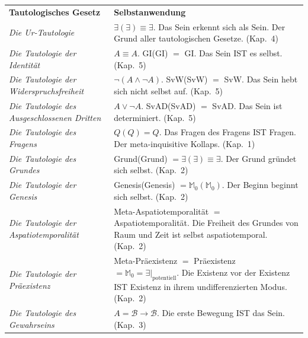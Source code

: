 \documentclass[10pt, openany, oneside]{book}
\renewcommand{\footnotesize}{\fontsize{8.5}{11}\selectfont}
\begin{document}
\vspace{0.5em}

{\footnotesize
\noindent\begin{tabular}{@{} p{} @{\hspace{0.5em}} p{} @{}}
\textbf{Tautologisches Gesetz} & \textbf{Selbstanwendung} \\[0.5em]

\textit{Die Ur-Tautologie} & $\exists(\exists) \equiv \exists$. Das Sein erkennt sich als Sein. Der Grund aller tautologischen Gesetze. (Kap.\ 4) \\[0.3em]

\textit{Die Tautologie der Identität} & $A \equiv A$. GI(GI) $=$ GI. Das Sein IST es selbst. (Kap.\ 5) \\[0.3em]

\textit{Die Tautologie der Widerspruchsfreiheit} & $\neg(A \wedge \neg A)$. SvW(SvW) $=$ SvW. Das Sein hebt sich nicht selbst auf. (Kap.\ 5) \\[0.3em]

\textit{Die Tautologie des Ausgeschlossenen Dritten} & $A \vee \neg A$. SvAD(SvAD) $=$ SvAD. Das Sein ist determiniert. (Kap.\ 5) \\[0.3em]

\textit{Die Tautologie des Fragens} & $Q(Q) = Q$. Das Fragen des Fragens IST Fragen. Der meta-inquisitive Kollaps. (Kap.\ 1) \\[0.3em]

\textit{Die Tautologie des Grundes} & Grund(Grund) $= \exists(\exists) \equiv \exists$. Der Grund gründet sich selbst. (Kap.\ 2) \\[0.3em]

\textit{Die Tautologie der Genesis} & Genesis(Genesis) $= \mathbb{M}_0(\mathbb{M}_0)$. Der Beginn beginnt sich selbst. (Kap.\ 2) \\[0.3em]

\textit{Die Tautologie der Aspatiotemporalität} & Meta-Aspatiotemporalität $=$ Aspatiotemporalität. Die Freiheit des Grundes von Raum und Zeit ist selbst aspatiotemporal. (Kap.\ 2) \\[0.3em]

\textit{Die Tautologie der Präexistenz} & Meta-Präexistenz $=$ Präexistenz $= \mathbb{M}_0 = \exists|_{\text{potentiell}}$. Die Existenz vor der Existenz IST Existenz in ihrem undifferenzierten Modus. (Kap.\ 2) \\[0.3em]

\textit{Die Tautologie des Gewahrseins} & $A = \mathcal{B} \to \mathcal{B}$. Die erste Bewegung IST das Sein. (Kap.\ 3) \\[0.3em]


\end{tabular}}
\end{document}
